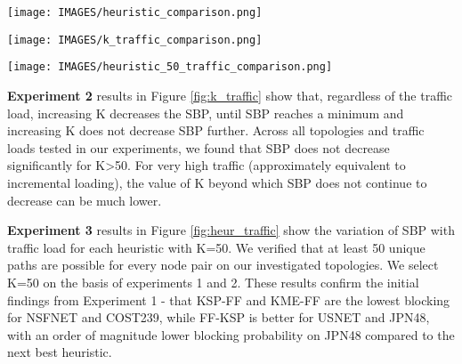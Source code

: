 \begin{figure*}[p]
  \texttt{[image: IMAGES/heuristic\_comparison.png]}
  \caption{Service blocking probability (SBP) for heuristics at fixed traffic and varying numbers of candidate paths (K). The mean and standard deviation (shaded area) are calculated from 3000 trials of 10,000 traffic requests per data point. Increasing K decreases the SBP for most heuristics. KSP-FF and FF-KSP give lowest SBP, depending on topology.}
  \label{fig:heur_comp}

  \vspace{1em}
  \texttt{[image: IMAGES/k\_traffic\_comparison.png]}
  \caption{Service blocking probability (SBP) for KSP-FF at varying traffic loads and K values. The mean and standard deviation (shaded area) are calculated from 3000 trials of 10,000 traffic requests per data point. For all traffic loads, increasing K decreases SBP for KSP-FF. Improvements saturate at high K.}
  \label{fig:k_traffic}

  \vspace{1em}
  \texttt{[image: IMAGES/heuristic\_50\_traffic\_comparison.png]}
  \caption{Service blocking probability (SBP) for heuristics at varying traffic load for K=50. The mean and standard deviation (shaded area) are calculated from 3000 trials of 10,000 traffic requests per data point. KSP-FF is the best heuristic for NSFNET and COST239. FF-KSP is best for USNET and JPN48.}
  \label{fig:heur_traffic}
\end{figure*}

\textbf{Experiment 2} results in Figure \ref{fig:k_traffic} show that, regardless of the traffic load, increasing K decreases the SBP, until SBP reaches a minimum and increasing K does not decrease SBP further. Across all topologies and traffic loads tested in our experiments, we found that SBP does not decrease significantly for K>50. For very high traffic (approximately equivalent to incremental loading), the value of K beyond which SBP does not continue to decrease can be much lower.

\textbf{Experiment 3} results in Figure \ref{fig:heur_traffic} show the variation of SBP with traffic load for each heuristic with K=50. We verified that at least 50 unique paths are possible for every node pair on our investigated topologies. We select K=50 on the basis of experiments 1 and 2. These results confirm the initial findings from Experiment 1 - that KSP-FF and KME-FF are the lowest blocking for NSFNET and COST239\footnotemark, while FF-KSP is better for USNET and JPN48, with an order of magnitude lower blocking probability on JPN48 compared to the next best heuristic.

